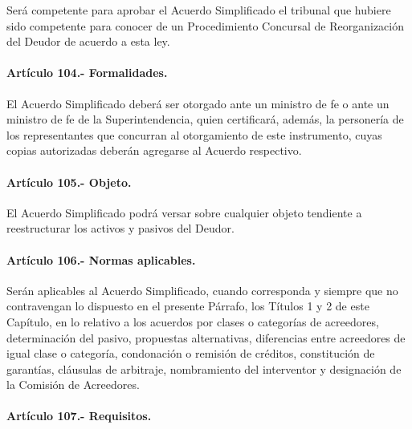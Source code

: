 \documentclass[
]{book}
\begin{document}
Será competente para aprobar el Acuerdo Simplificado el tribunal que hubiere sido competente para conocer de un Procedimiento Concursal de Reorganización del Deudor de acuerdo a esta ley.

\hypertarget{artuxedculo-104.--formalidades.}{%
\paragraph*{Artículo 104.- Formalidades.}\label{artuxedculo-104.--formalidades.}}

El Acuerdo Simplificado deberá ser otorgado ante un ministro de fe o ante un ministro de fe de la Superintendencia, quien certificará, además, la personería de los representantes que concurran al otorgamiento de este instrumento, cuyas copias autorizadas deberán agregarse al Acuerdo respectivo.

\hypertarget{artuxedculo-105.--objeto.}{%
\paragraph*{Artículo 105.- Objeto.}\label{artuxedculo-105.--objeto.}}

El Acuerdo Simplificado podrá versar sobre cualquier objeto tendiente a reestructurar los activos y pasivos del Deudor.

\hypertarget{artuxedculo-106.--normas-aplicables.}{%
\paragraph*{Artículo 106.- Normas aplicables.}\label{artuxedculo-106.--normas-aplicables.}}

Serán aplicables al Acuerdo Simplificado, cuando corresponda y siempre que no contravengan lo dispuesto en el presente Párrafo, los Títulos 1 y 2 de este Capítulo, en lo relativo a los acuerdos por clases o categorías de acreedores, determinación del pasivo, propuestas alternativas, diferencias entre acreedores de igual clase o categoría, condonación o remisión de créditos, constitución de garantías, cláusulas de arbitraje, nombramiento del interventor y designación de la Comisión de Acreedores.

\hypertarget{artuxedculo-107.--requisitos.}{%
\paragraph*{Artículo 107.- Requisitos.}\label{artuxedculo-107.--requisitos.}}
\end{document}
